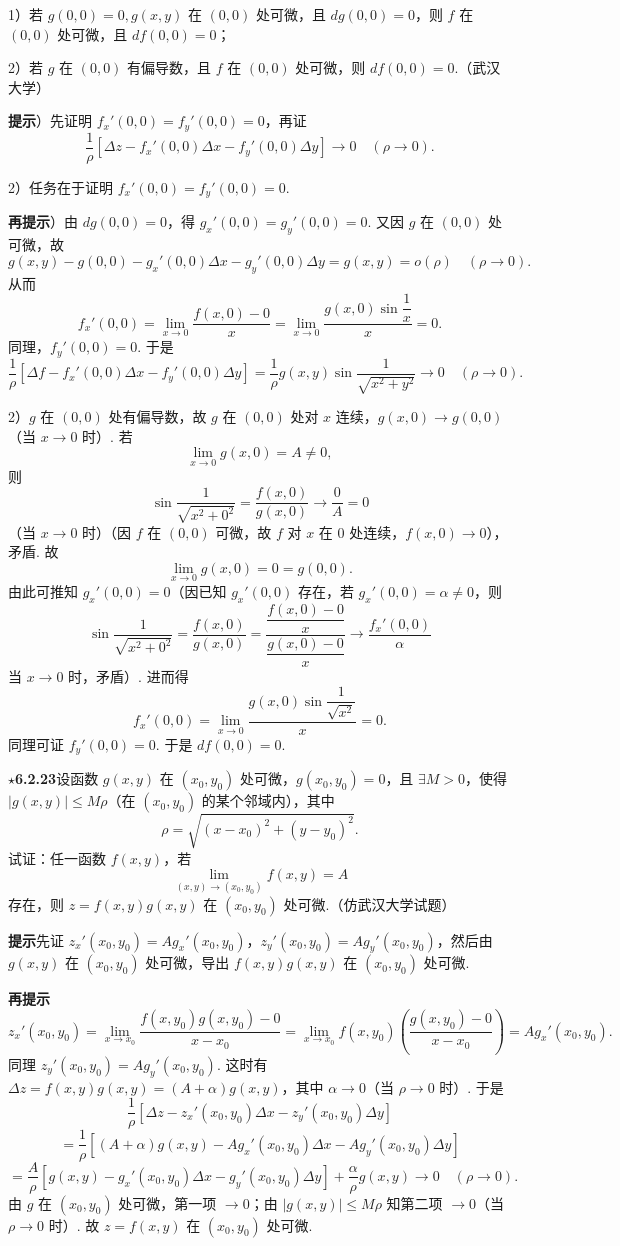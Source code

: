 \documentclass[UTF8, 12pt, fontset=fandol, oneside]{ctexart}
\begin{document}
1）若 $g(0,0)=0,g(x,y)$ 在 $(0,0)$ 处可微，且 $dg(0,0)=0$，则 $f$ 在 $(0,0)$ 处可微，且 $df(0,0)=0$；

2）若 $g$ 在 $(0,0)$ 有偏导数，且 $f$ 在 $(0,0)$ 处可微，则 $df(0,0)=0$.（武汉大学）

\noindent\textbf{提示}）先证明 $f_x'(0,0)=f_y'(0,0)=0$，再证
\[
  \frac1\rho[\Delta z-f_x'(0,0)\Delta x-f_y'(0,0)\Delta y]\to0\quad(\rho\to0).
\]

2）任务在于证明 $f_x'(0,0)=f_y'(0,0)=0$.

\noindent\textbf{再提示}）由 $dg(0,0)=0$，得 $g_x'(0,0)=g_y'(0,0)=0$. 又因 $g$ 在 $(0,0)$ 处可微，故
\[
  g(x,y)-g(0,0)-g_x'(0,0)\Delta x-g_y'(0,0)\Delta y=g(x,y)=o(\rho)\quad(\rho\to0).
\]
从而
\[
  f_x'(0,0)=\lim_{x\to0}\frac{f(x,0)-0}{x}
  =\lim_{x\to0}\frac{g(x,0)\sin\dfrac1x}{x}=0.
\]
同理，$f_y'(0,0)=0$. 于是
\[
  \frac1\rho[\Delta f-f_x'(0,0)\Delta x-f_y'(0,0)\Delta y]
  =\frac1\rho g(x,y)\sin\frac1{\sqrt{x^2+y^2}}\to0\quad(\rho\to0).
\]

2）$g$ 在 $(0,0)$ 处有偏导数，故 $g$ 在 $(0,0)$ 处对 $x$ 连续，$g(x,0)\to g(0,0)$（当 $x\to0$ 时）. 若
\[
  \lim_{x\to0}g(x,0)=A\ne0,
\]
则
\[
  \sin\frac1{\sqrt{x^2+0^2}}=\frac{f(x,0)}{g(x,0)}\to\frac0A=0
\]
（当 $x\to0$ 时）（因 $f$ 在 $(0,0)$ 可微，故 $f$ 对 $x$ 在 $0$ 处连续，$f(x,0)\to0$），矛盾. 故
\[
  \lim_{x\to0}g(x,0)=0=g(0,0).
\]
由此可推知 $g_x'(0,0)=0$（因已知 $g_x'(0,0)$ 存在，若 $g_x'(0,0)=\alpha\ne0$，则
\[
  \sin\frac1{\sqrt{x^2+0^2}}
  =\frac{f(x,0)}{g(x,0)}
  =\frac{\dfrac{f(x,0)-0}{x}}{\dfrac{g(x,0)-0}{x}}\to\frac{f_x'(0,0)}{\alpha}
\]
当 $x\to0$ 时，矛盾）. 进而得
\[
  f_x'(0,0)=\lim_{x\to0}\frac{g(x,0)\sin\dfrac1{\sqrt{x^2}}}{x}=0.
\]
同理可证 $f_y'(0,0)=0$. 于是 $df(0,0)=0$.

\noindent\textbf{\ensuremath{\star}6.2.23}\quad 设函数 $g(x,y)$ 在 $(x_0,y_0)$ 处可微，$g(x_0,y_0)=0$，且 $\exists M>0$，使得 $|g(x,y)|\le M\rho$（在 $(x_0,y_0)$ 的某个邻域内），其中
\[
  \rho=\sqrt{(x-x_0)^2+(y-y_0)^2}.
\]
试证：任一函数 $f(x,y)$，若
\[
  \lim_{(x,y)\to(x_0,y_0)}f(x,y)=A
\]
存在，则 $z=f(x,y)g(x,y)$ 在 $(x_0,y_0)$ 处可微.（仿武汉大学试题）

\noindent\textbf{提示}\quad 先证 $z_x'(x_0,y_0)=Ag_x'(x_0,y_0)$，$z_y'(x_0,y_0)=Ag_y'(x_0,y_0)$，然后由 $g(x,y)$ 在 $(x_0,y_0)$ 处可微，导出 $f(x,y)g(x,y)$ 在 $(x_0,y_0)$ 处可微.

\noindent\textbf{再提示}\quad
\[
  z_x'(x_0,y_0)=\lim_{x\to x_0}
  \frac{f(x,y_0)g(x,y_0)-0}{x-x_0}
  =\lim_{x\to x_0}f(x,y_0)
  \left(\frac{g(x,y_0)-0}{x-x_0}\right)
  =Ag_x'(x_0,y_0).
\]
同理 $z_y'(x_0,y_0)=Ag_y'(x_0,y_0)$. 这时有 $\Delta z=f(x,y)g(x,y)=(A+\alpha)g(x,y)$，其中 $\alpha\to0$（当 $\rho\to0$ 时）. 于是
\[
  \frac1\rho[\Delta z-z_x'(x_0,y_0)\Delta x-z_y'(x_0,y_0)\Delta y]
\]
\[
  =\frac1\rho[(A+\alpha)g(x,y)-Ag_x'(x_0,y_0)\Delta x-Ag_y'(x_0,y_0)\Delta y]
\]
\[
  =\frac A\rho[g(x,y)-g_x'(x_0,y_0)\Delta x-g_y'(x_0,y_0)\Delta y]
  +\frac\alpha\rho g(x,y)\to0\quad(\rho\to0).
\]
由 $g$ 在 $(x_0,y_0)$ 处可微，第一项 $\to0$；由 $|g(x,y)|\le M\rho$ 知第二项 $\to0$（当 $\rho\to0$ 时）. 故 $z=f(x,y)$ 在 $(x_0,y_0)$ 处可微.
\end{document}
